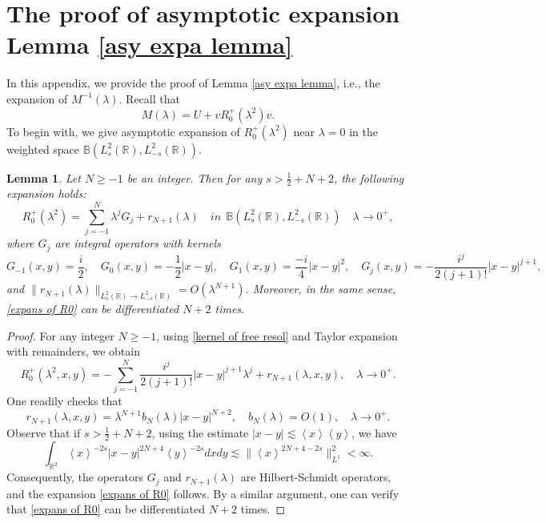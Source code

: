 \documentclass[reqno]{amsart}
\newtheorem{lemma}[definition]{Lemma}
\newcommand\R{\mathbb{R}}
\newcommand\B{\mathbb{B}}
\numberwithin{equation}{section}
\begin{document}
\section{The proof of asymptotic expansion Lemma \ref{asy expa lemma}}\label{proof of asy expansion}
In this appendix, we provide the proof of Lemma \ref{asy expa lemma}, i.e., the expansion of $M^{-1}(\lambda)$. Recall that $$M(\lambda)=U+vR^{+}_{0}(\lambda^{2})v.$$
To begin with, we give asymptotic expansion of $R^{+}_{0}(\lambda^2)$ near $\lambda=0$ in the weighted space $\B(L^2_s(\R),L^2_{-s}(\R))$.
\begin{lemma}
Let $N\geq-1$ be an integer. Then for any $s>\frac{1}{2}+N+2$, the following expansion holds:
\begin{equation}\label{expans of R0} R^{+}_0(\lambda^2)=\sum\limits_{j=-1}^{N}\lambda^jG_j+r_{N+1}(\lambda) \quad in\ \ \B(L^2_s(\R),L^2_{-s}(\R))\quad\lambda\rightarrow0^+,
\end{equation}
where $G_j$ are integral operators with kernels 
\begin{equation*}
    G_{-1}(x,y)=\frac{i}{2},\quad G_0(x,y)=-\frac{1}{2}|x-y|, \quad G_1(x,y)=\frac{- i}{4}|x-y|^2,\quad
    G_j(x,y)=-\frac{i^{j}}{2(j+1)!}|x-y|^{j+1},
\end{equation*}
and $\|r_{N+1}(\lambda)\|_{L^2_s(\R)\rightarrow L^2_{-s}(\R)}=O(\lambda^{N+1})$. Moreover, in the same sense, \eqref{expans of R0} can be differentiated $N+2$ times.
\end{lemma}
\begin{proof}
For any integer $N\geq-1$, using \eqref{kernel of free resol} and Taylor expansion with remainders, we obtain
\begin{equation*}
R^+_0(\lambda^2,x,y)=-\sum\limits_{j=-1}^{N}\frac{i^{j}}{2(j+1)!}|x-y|^{j+1}\lambda^j+r_{N+1}(\lambda,x,y),\quad \lambda\rightarrow 0^+.
\end{equation*}
One readily checks that 
\begin{equation*}
r_{N+1}(\lambda,x,y)=\lambda^{N+1}b_N(\lambda)|x-y|^{N+2},\quad b_N(\lambda)=O(1),\quad \lambda\rightarrow 0^+.
\end{equation*}
Observe that if $s>\frac{1}{2}+N+2$, using the estimate $|x-y|\lesssim\left<x\right> \left<y\right>$, we have
\begin{equation*}
\int_{\R^2}\left<x\right>^{-2s}|x-y|^{2N+4} \left<y\right>^{-2s}dxdy\lesssim \|\left<x\right>^{2N+4-2s}\|^2_{L^1}<\infty.
\end{equation*}
Consequently, the operators $G_j$ and $r_{N+1}(\lambda)$ are Hilbert-Schmidt operators, and the expansion \eqref{expans of R0} follows. By a similar argument, one can verify  that \eqref{expans of R0} can be differentiated $N+2$ times.
\end{proof}
\end{document}
